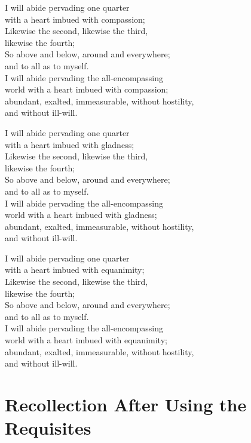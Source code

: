 I will abide pervading one quarter\\
with a heart imbued with compassion;\\
Likewise the second, likewise the third,\\ likewise the fourth;\\
So above and below, around and everywhere;\\ and to all as to myself.\\
I will abide pervading the all-encompassing\\
world with a heart imbued with compassion;\\
abundant, exalted, immeasurable, without hostility,\\
and without ill-will.

I will abide pervading one quarter\\
with a heart imbued with gladness;\\
Likewise the second, likewise the third,\\ likewise the fourth;\\
So above and below, around and everywhere;\\ and to all as to myself.\\
I will abide pervading the all-encompassing\\
world with a heart imbued with gladness;\\
abundant, exalted, immeasurable, without hostility,\\
and without ill-will.

I will abide pervading one quarter\\
with a heart imbued with equanimity;\\
Likewise the second, likewise the third,\\ likewise the fourth;\\
So above and below, around and everywhere;\\ and to all as to myself.\\
I will abide pervading the all-encompassing\\
world with a heart imbued with equanimity;\\
abundant, exalted, immeasurable, without hostility,\\
and without ill-will.

\section{Recollection After Using the Requisites}
\label{recollection-after-using}

